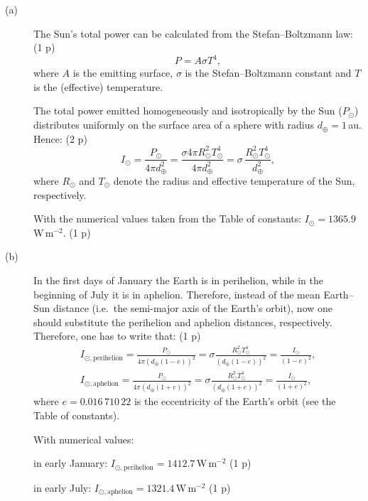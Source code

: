\begin{description}
\item[(a)] The Sun's total power can be calculated from the
  Stefan--Boltzmann law: \hfill(1 p)
  \begin{equation*}
  P = A\sigma T^4, \tag{7.1}
  \end{equation*}
  where $A$ is the emitting surface, $\sigma$ is the Stefan--Boltzmann
  constant and $T$ is the (effective) temperature.

  The total power emitted homogeneously and isotropically by the Sun
  ($P_\odot$) distributes uniformly on the surface area of a sphere with
  radius $d_\oplus = 1$\,au. Hence: \hfill(2 p)
  \begin{equation*}
  I_\odot = \frac{P_\odot}{4\pi d_\oplus^2}
          = \frac{\sigma 4\pi R_\odot^2 T_\odot^4}{4\pi d_\oplus^2}
          = \sigma\,\frac{R_\odot^2 T_\odot^4}{d_\oplus^2}, \tag{7.2}
  \end{equation*}
  where $R_\odot$ and $T_\odot$ denote the radius and effective temperature of
  the Sun, respectively.

  With the numerical values taken from the Table of constants:
  $I_\odot = 1365.9$\,W\,m$^{-2}$. \hfill(1 p)
\item[(b)] In the first days of January the Earth is in perihelion, while in
  the beginning of July it is in aphelion. Therefore, instead of the mean
  Earth--Sun distance (i.e.\ the semi-major axis of the Earth's orbit), now
  one should substitute the perihelion and aphelion distances, respectively.
  Therefore, one has to write that: \hfill(1 p)
  \begin{gather*}
  I_{\odot,\mathrm{perihelion}} = \frac{P_\odot}{4\pi(d_\oplus(1-e))^2}
    = \sigma \frac{R_\odot^2 T_\odot^4}{(d_\oplus(1-e))^2}
    = \frac{I_\odot}{(1-e)^2}, \tag{7.3}\\
  I_{\odot,\mathrm{aphelion}} = \frac{P_\odot}{4\pi(d_\oplus(1+e))^2}
    = \sigma \frac{R_\odot^2 T_\odot^4}{(d_\oplus(1+e))^2}
    = \frac{I_\odot}{(1+e)^2}, \tag{7.4}
  \end{gather*}
  where $e = 0.016\,710\,22$ is the eccentricity of the Earth's orbit (see the
  Table of constants).

  With numerical values:

  in early January: $I_{\odot,\mathrm{perihelion}} = 1412.7$\,W\,m$^{-2}$
  \hfill(1 p)

  in early July: $I_{\odot,\mathrm{aphelion}} = 1321.4$\,W\,m$^{-2}$
  \hfill(1 p)


\end{description}
